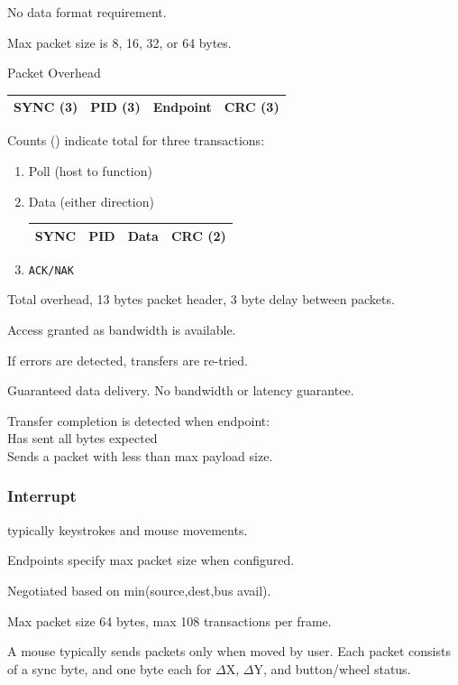 No data format requirement.

Max packet size is 8, 16, 32, or 64 bytes.

Packet Overhead 

\begin{tabular}{|c|c|c|c| }
\hline
SYNC (3)  & PID (3) & Endpoint & CRC (3)   \\
\hline
\end{tabular}

Counts () indicate total for three transactions:

\begin{enumerate}
	\item Poll (host to function)
	\item Data (either direction) \\
	
\begin{tabular}{|c|c|c|c|}
\hline
SYNC    & PID   & Data & CRC (2)   \\
\hline
\end{tabular}

	\item {\tt ACK/NAK}
\end{enumerate}

Total overhead, 13 bytes packet header, 3 byte delay between
packets.

Access granted as bandwidth is available.

If errors are detected, transfers are re-tried.

Guaranteed data delivery. No bandwidth or latency guarantee.

Transfer completion is detected when endpoint: \\
\hspace{0.5in}Has sent all bytes expected \\
\hspace{0.5in}Sends a packet with less than max payload size.

\subsubsection{Interrupt}
typically keystrokes and mouse movements.

Endpoints specify max packet size when configured.

Negotiated based on min(source,dest,bus avail).

Max packet size 64 bytes, max 108 transactions per frame.

A mouse typically sends packets only when moved by user.
Each packet consists of a sync byte, and one byte each
for $\Delta$X, $\Delta$Y, and button/wheel status.

